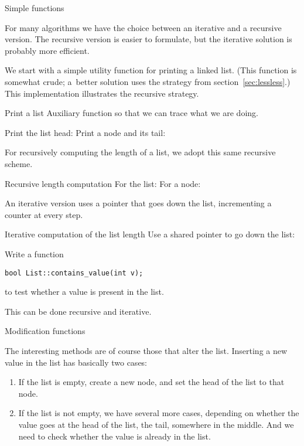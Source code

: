  {Simple functions}

For many algorithms we have the choice between an iterative and a
recursive version. The recursive version is easier to formulate, but
the iterative solution is probably more efficient.

We start with a simple utility function for printing a linked list.
(This function is somewhat crude; a~better solution uses
the strategy from section~\ref{sec:lessless}.)
This implementation illustrates the recursive strategy.

\begin{block}{Print a list}
  \label{sl:linkedlist-print}
  Auxiliary function so that we can trace what we are doing.
  \begin{multicols}{2}
    Print the list head:
    \columnbreak
    Print a node and its tail:
  \end{multicols}
\end{block}

For recursively computing the length of a list,
we adopt this same recursive scheme.

\begin{block}{Recursive length computation}
  \label{sl:linkedlist-length-recur}
  For the list:
  For a node:
\end{block}

An iterative version uses a pointer that goes down the list,
incrementing a counter at every step. 

\begin{block}{Iterative computation of the list length}
  \label{sl:linkedlist-length-iter}
  Use a shared pointer to go down the list:
\end{block}

\begin{exercise}
  \label{ex:list-contains}
  Write a function
\begin{lstlisting}
bool List::contains_value(int v);
\end{lstlisting}
to test whether a value is present in the list.

This can be done recursive and iterative.
\end{exercise}

 {Modification functions}

The interesting methods are of course those that alter the
list. Inserting a new value in the list has basically two cases:
\begin{enumerate}
\item If the list is empty, create a new node, and set the head of the
  list to that node.
\item If the list is not empty, we have several more cases, depending
  on whether the value goes at the head of the list, the tail,
  somewhere in the middle. And we need to check whether the value is
  already in the list.
\end{enumerate}

